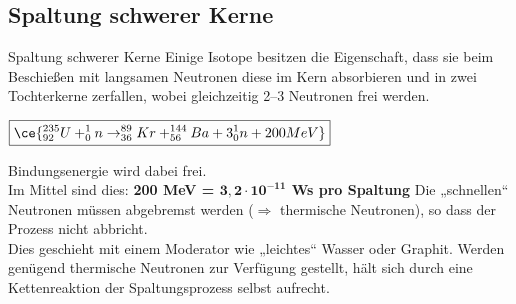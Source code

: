 \subsection{Spaltung schwerer Kerne}

\begin{outline}
    \1 Spaltung schwerer Kerne
    \1 Einige Isotope besitzen die Eigenschaft, dass sie beim Beschießen mit langsamen Neutronen diese im Kern absorbieren und in zwei Tochterkerne zerfallen, wobei gleichzeitig 2–3 Neutronen frei werden.

    \vspace{0.2cm}

    $\boxed{
    \ce{^{235}_{92}U + ^{1}_{0}n \rightarrow  ^{89}_{36}Kr + ^{144}_{56}Ba + 3 ^{1}_{0}n + 200MeV}
    }$

    \vspace{0.2cm}

    \1 Bindungsenergie wird dabei frei.\\
        Im Mittel sind dies: 
        \textbf{200 MeV = $\bm{3{,}2 \cdot 10^{-11}}$ Ws pro Spaltung}
    \1 Die „schnellen“ Neutronen müssen abgebremst werden ($\Rightarrow$  thermische Neutronen), so dass der Prozess nicht abbricht.\\
    Dies geschieht mit einem Moderator wie „leichtes“ Wasser oder Graphit.
    \1 Werden genügend thermische Neutronen zur Verfügung gestellt, hält sich durch eine Kettenreaktion der Spaltungsprozess selbst aufrecht.
\end{outline}























